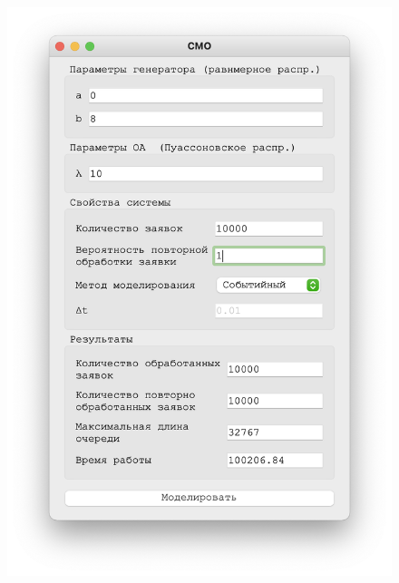  \begin{figure}[!htb]
    \begin{minipage}{0.55\textwidth}
      \centering
      \includegraphics[width=1\linewidth]{10-1-s}
    \end{minipage}\hfill
    \begin{minipage}{0.55\textwidth}
      \centering

\end{minipage}
\end{figure}
